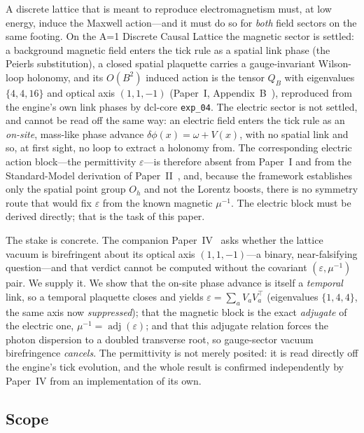 
\label{sec:introduction}

A discrete lattice that is meant to reproduce electromagnetism must, at low
energy, induce the Maxwell action---and it must do so for \emph{both} field
sectors on the same footing. On the A=1 Discrete Causal Lattice the magnetic
sector is settled: a background magnetic field enters the tick rule as a spatial
link phase (the Peierls substitution), a closed spatial plaquette carries a
gauge-invariant Wilson-loop holonomy, and its $O(B^2)$ induced action is the
tensor $Q_B$ with eigenvalues $\{4,4,16\}$ and optical axis $(1,1,-1)$ (Paper~I,
Appendix~B~\cite{PaperI}), reproduced from the engine's own link phases by
dcl-core \texttt{exp\_04}. The electric sector is not settled, and cannot be read
off the same way: an electric field enters the tick rule as an \emph{on-site},
mass-like phase advance $\delta\phi(x)=\omega+V(x)$, with no spatial link and so,
at first sight, no loop to extract a holonomy from. The corresponding electric
action block---the permittivity $\varepsilon$---is therefore absent from Paper~I
and from the Standard-Model derivation of Paper~II~\cite{PaperII}, and, because the
framework establishes only the spatial point group $O_h$ and not the Lorentz
boosts, there is no symmetry route that would fix $\varepsilon$ from the known
magnetic $\mu^{-1}$. The electric block must be derived directly; that is the task
of this paper.

The stake is concrete. The companion Paper~IV~\cite{PaperIV} asks whether the
lattice vacuum is birefringent about its optical axis $(1,1,-1)$---a binary,
near-falsifying question---and that verdict cannot be computed without the
covariant $(\varepsilon,\mu^{-1})$ pair. We supply it. We show that the on-site
phase advance is itself a \emph{temporal} link, so a temporal plaquette closes and
yields $\varepsilon=\sum_a V_a V_a^{\!\top}$ (eigenvalues $\{1,4,4\}$, the same
axis now \emph{suppressed}); that the magnetic block is the exact \emph{adjugate}
of the electric one, $\mu^{-1}=\operatorname{adj}(\varepsilon)$; and that this
adjugate relation forces the photon dispersion to a doubled transverse root, so
gauge-sector vacuum birefringence \emph{cancels}. The permittivity is not merely
posited: it is read directly off the engine's tick evolution, and the whole result
is confirmed independently by Paper~IV from an implementation of its own.

\subsection{Scope}
\label{subsec:scope}

